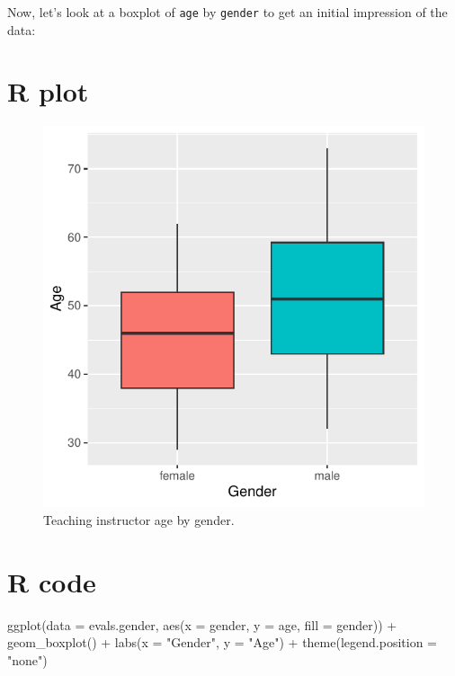 \documentclass[
  letterpaper,
  DIV=11,
  numbers=noendperiod]{scrartcl}
\newenvironment{Shaded}{\begin{snugshade}}{\end{snugshade}}
\newcommand{\AttributeTok}[1]{\textcolor[rgb]{0.40,0.45,0.13}{#1}}
\newcommand{\FunctionTok}[1]{\textcolor[rgb]{0.28,0.35,0.67}{#1}}
\newcommand{\NormalTok}[1]{\textcolor[rgb]{0.00,0.23,0.31}{#1}}
\newcommand{\SpecialCharTok}[1]{\textcolor[rgb]{0.37,0.37,0.37}{#1}}
\newcommand{\StringTok}[1]{\textcolor[rgb]{0.13,0.47,0.30}{#1}}
\begin{document}
Now, let's look at a boxplot of \texttt{age} by \texttt{gender} to get
an initial impression of the data:

\section{R plot}

\begin{figure}[H]

{\centering \includegraphics{index_files/figure-pdf/unnamed-chunk-4-1.pdf}

}

\caption{Teaching instructor age by gender.}

\end{figure}%

\section{R code}

\begin{Shaded}
\begin{Highlighting}[]
\FunctionTok{ggplot}\NormalTok{(}\AttributeTok{data =}\NormalTok{ evals.gender,}
       \FunctionTok{aes}\NormalTok{(}\AttributeTok{x =}\NormalTok{ gender, }\AttributeTok{y =}\NormalTok{ age, }\AttributeTok{fill =}\NormalTok{ gender)) }\SpecialCharTok{+}
  \FunctionTok{geom\_boxplot}\NormalTok{() }\SpecialCharTok{+}
  \FunctionTok{labs}\NormalTok{(}\AttributeTok{x =} \StringTok{"Gender"}\NormalTok{, }\AttributeTok{y =} \StringTok{"Age"}\NormalTok{) }\SpecialCharTok{+}
  \FunctionTok{theme}\NormalTok{(}\AttributeTok{legend.position =} \StringTok{"none"}\NormalTok{)}
\end{Highlighting}
\end{Shaded}
\end{document}
